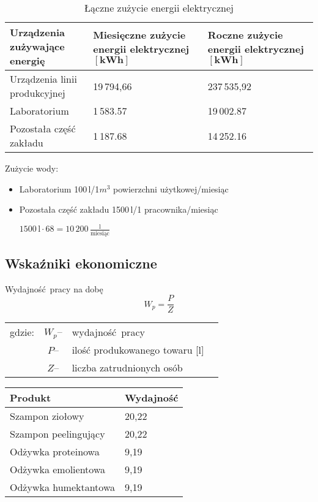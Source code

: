 \begin{table}[h]
	\centering
	\caption{Łączne zużycie energii elektrycznej}
	\begin{tabular}{lll}
		\hline
		\makecell[l]{\textbf{Urządzenia zużywające} \\ \textbf{energię}} & \makecell[l]{\textbf{Miesięczne zużycie} \\ \textbf{energii elektrycznej} \\ $[\mathrm{\mathbf{kWh}}]$} & \makecell[l]{\textbf{Roczne zużycie} \\ \textbf{energii elektrycznej} \\ $[\mathrm{\mathbf{kWh}}]$}\\
		\hline\hline
		\makecell[l]{Urządzenia linii \\ produkcyjnej} & 19\,794,66 & 237\,535,92 \\
		\hline
		Laboratorium & 1\,583.57 & 19\,002.87 \\
		\hline
		\makecell[l]{Pozostała część \\ zakładu} & 1\,187.68 & 14\,252.16 \\
		\hline
	\end{tabular}
\end{table}

Zużycie wody:
\begin{itemize}
	\item Laboratorium 100\,l/1$m^{3}$ powierzchni użytkowej/miesiąc
	\item Pozostała część zakładu 1500\,l/1 pracownika/miesiąc

		$1500\,\mathrm{l} \cdot 68 = 10\,200\,\frac{\mathrm{l}}{\text{miesiąc}}$
\end{itemize}

\subsection{Wskaźniki ekonomiczne}

Wydajność pracy na dobę
\begin{equation}
	W_{p} = \frac{P}{Z}
\end{equation}
\begin{tabular}{rcll}
	gdzie:&$W_{p}$--&wydajność pracy \\
	&$P$--&ilość produkowanego towaru [l] \\
	&$Z$--&liczba zatrudnionych osób \\
\end{tabular}

\begin{center}
	\begin{tabular}{ll}
		\hline
		Produkt & Wydajność \\
		\hline\hline
		Szampon ziołowy & 20,22 \\
		Szampon peelingujący & 20,22 \\
		Odżywka proteinowa & 9,19 \\
		Odżywka emolientowa & 9,19 \\
		Odżywka humektantowa & 9,19 \\
		\hline
	\end{tabular}
\end{center}

